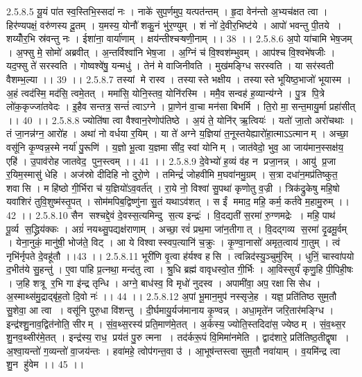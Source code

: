 2.5.8.5
यू॒यं पा॑त स्व॒स्तिभि॒स्सदा॑ नः । नाके॑ सुप॒र्णमुप॒ यत्पत॑न्तम् । हृ॒दा वेन॑न्तो अ॒भ्यच॑क्षत त्वा । हिर॑ण्यपक्षं॒ वरु॑णस्य दू॒तम् । य॒मस्य॒ योनौ॑ शकु॒नं भु॑र॒ण्युम् । शं नो॑ दे॒वीर॒भिष्ट॑ये । आपो॑ भवन्तु पी॒तये । शय्योँर॒भि स्र॑वन्तु नः । ईशा॑ना॒ वार्या॑णाम् । क्षय॑न्तीश्चऱ्षणी॒नाम् ।। 38 ।।
2.5.8.6
अ॒पो या॑चामि भेष॒जम् । अ॒फ्सु मे॒ सोमो॑ अब्रवीत् । अ॒न्तर्विश्वा॑नि भेष॒जा । अ॒ग्निं च॑ वि॒श्वश॑म्भुवम् । आप॑श्च वि॒श्वभे॑षजीः । यद॒फ्सु ते॑ सरस्वति । गोष्वश्वे॑षु॒ यन्मधु॑ । तेन॑ मे वाजिनीवति । मुख॑मङ्ग्धि सरस्वति । या सर॑स्वती वैशम्भ॒ल्या ।। 39 ।।
2.5.8.7
तस्यां मे रास्व । तस्यास्ते भक्षीय । तस्यास्ते भूयिष्ठ॒भाजो॑ भूयास्म । अ॒हं त्वद॑स्मि॒ मद॑सि॒ त्वमे॒तत् । ममा॑सि॒ योनि॒स्तव॒ योनि॑रस्मि । ममै॒व सन्वह॑ ह॒व्यान्य॑ग्ने । पु॒त्र पि॒त्रे लो॑क॒कृज्जा॑तवेदः । इ॒हैव सन्तत्र॒ सन्तं॑ त्वाऽग्ने । प्रा॒णेन॑ वा॒चा मन॑सा बिभर्मि । ति॒रो मा॒ सन्त॒मायु॒र्मा प्रहा॑सीत् ।। 40 ।।
2.5.8.8
ज्योति॑षा त्वा वैश्वान॒रेणोप॑तिष्ठे । अ॒यं ते॒ योनि॑र् ऋ॒त्वियः॑ । यतो॑ जा॒तो अरो॑चथाः । तं जा॒नन्न॑ग्न॒ आरो॑ह । अथा॑ नो वर्धया र॒यिम् । या ते॑ अग्ने य॒ज्ञिया॑ त॒नूस्तयेह्यारो॑हा॒त्माऽऽत्मानम् । अच्छा॒ वसू॑नि कृ॒ण्वन्न॒स्मे नर्या॑ पु॒रूणि॑ । य॒ज्ञो भू॒त्वा य॒ज्ञमा सी॑द॒ स्वां योनिम् । जात॑वेदो॒ भुव॒ आ जाय॑मान॒स्सक्ष॑य॒ एहि॑ । उ॒पाव॑रोह जातवेद॒ पुन॒स्त्वम् ।। 41 ।।
2.5.8.9
दे॒वेभ्यो॑ ह॒व्यं व॑ह न प्रजा॒नन्न् । आयु॑ प्र॒जा र॒यिम॒स्मासु॑ धेहि । अज॑स्रो दीदिहि नो दुरो॒णे । तमिन्द्रं॑ जोहवीमि म॒घवा॑नमु॒ग्रम् । स॒त्रा दधा॑न॒मप्र॑तिष्कुत॒॒ शवा॑सि । महि॑ष्ठो गी॒र्भिरा च॑ य॒ज्ञियो॑ऽव॒वर्त॑त् । रा॒ये नो॒ विश्वा॑ सु॒पथा॑ कृणोतु व॒ज्री । त्रिक॑द्रुकेषु महि॒षो यवा॑शिरं तुवि॒शुष्म॑स्तृ॒पत् । सोम॑मपिब॒द्विष्णु॑ना सु॒तं यथाऽव॑शत् । स ईं ममाद॒ महि॒ कर्म॒ कर्त॑वे म॒हामु॒रुम् ।। 42 ।।
2.5.8.10
सैन॑ सश्चद्दे॒वं दे॒वस्स॒त्यमिन्दु॑ स॒त्य इन्द्रः॑ । वि॒दद्यती॑ स॒रमा॑ रु॒ग्णमद्रेः । महि॒ पाथ॑ पू॒र्व्य स॒द्ध्रिय॑क्कः । अग्रं॑ नयथ्सु॒पद्यक्ष॑राणाम् । अच्छा॒ रवं॑ प्रथ॒मा जा॑न॒तीगात् । वि॒दद्गव्य॑ स॒रमा॑ दृ॒ढमू॒र्वम् । येना॒नुकं॒ मानु॑षी॒ भोज॑ते॒ विट् । आ ये विश्वास्स्वप॒त्यानि॑ च॒क्रुः । कृ॒ण्वा॒नासो॑ अमृत॒त्वाय॑ गा॒तुम् । त्वं नृभि॑र्नृपते दे॒वहू॑तौ ।।43 ।।
2.5.8.11
भूरी॑णि वृ॒त्वा ह॑र्यश्व हसि । त्वन्निद॑स्यु॒ञ्चुमु॑रिम् । धुनिं॒ चास्वा॑पयो द॒भीत॑ये सु॒हन्तु॑ । ए॒वा पा॑हि प्र॒त्नथा॒ मन्द॑तु त्वा । श्रु॒धि ब्रह्म॑ वावृधस्वो॒त गी॒र्भिः । आ॒विस्सुर्यं॑ कृणु॒हि पी॒पिही॒षः । ज॒हि शत्रू॑ र॒भि गा इ॑न्द्र तृन्धि । अग्ने॒ बाध॑स्व॒ वि मृधो॑ नुदस्व । अपामी॑वा॒ अप॒ रक्षा॑सि सेध । अ॒स्माथ्स॑मु॒द्राद्बृ॑ह॒तो दि॒वो नः॑ ।। 44 ।।
2.5.8.12
अ॒पां भू॒मान॒मुप॑ नस्सृजे॒ह । यज्ञ॒ प्रति॑तिष्ठ सुम॒तौ सु॒शेवा॒ आ त्वा । वसू॑नि पुरु॒धा वि॑शन्तु । दी॒र्घमायु॒र्यज॑मानाय कृ॒ण्वन्न् । अधा॒मृते॑न जरि॒तार॑मङ्ग्धि । इन्द्र॑श्शु॒नाव॒द्वित॑नोति॒ सीरम् । सं॒व॒थ्स॒रस्य॑ प्रति॒माण॑मे॒तत् । अ॒र्कस्य॒ ज्योति॒स्तदिदा॑स॒ ज्येष्ठम् । सं॒व॒थ्स॒र शु॒नव॒थ्सीर॑मे॒तत् । इन्द्र॑स्य॒ राध॒ प्रय॑तं पु॒रु त्मना । तद॑र्करू॒पं वि॒मिमा॑नमेति । द्वाद॑शारे॒ प्रति॑तिष्ठ॒तीद्वृषा । अ॒श्वा॒यन्तो॑ ग॒व्यन्तो॑ वा॒जय॑न्तः । हवा॑महे॒ त्वोप॑गन्त॒वा उ॑ । आ॒भूष॑न्तस्त्वा सुम॒तौ नवा॑याम् । व॒यमि॑न्द्र त्वा शु॒न हु॑वेम ।। 45 ।।
